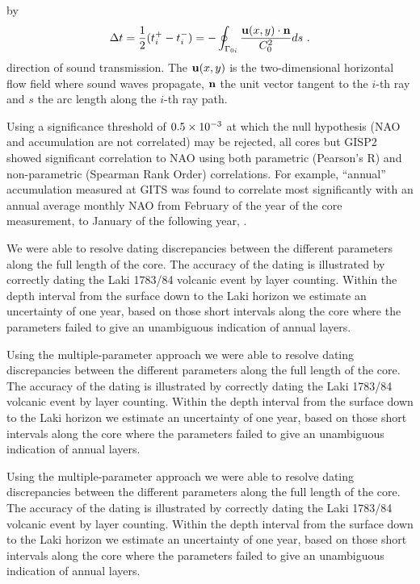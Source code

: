 \documentclass[jgrga]{agu2001}
\let\eject\relax
\begin{document}
\begin{article}
\eject
\noindent
 by
\begin{equation}
  \Delta t = \frac{1}{2} ( t_i^+ - t_i^- ) = - \oint_{\Gamma_{0i}}
  \frac{{\bf u}(x,y)\cdot {\bf n}}{C_0^2} ds\ .
\end{equation}
 direction of sound
transmission. 
The ${\bf u}(x,y)$ is the two-dimensional
horizontal
flow field where sound waves propagate, ${\bf n}$ the unit vector
tangent to the $i$-th ray and $s$ the arc length along the $i$-th
ray path. 

Using a significance threshold
of $\rm{0.5 \times 10^{-3}}$
at which the null hypothesis
(NAO and accumulation are not correlated) may be rejected,
all cores but GISP2 showed significant 
correlation to NAO using both parametric (Pearson's R) and non-parametric
(Spearman Rank Order) correlations.
For example, ``annual'' accumulation measured at GITS was found to correlate
most significantly with an annual average monthly NAO from February of the year
of the core measurement, to January of the following year,
 .



We were able to resolve dating discrepancies between the different
parameters along the full length of the core.
The accuracy of the dating is illustrated by correctly dating the
Laki 1783/84 volcanic event by layer counting.
Within the depth interval from the surface down to the Laki horizon
we estimate an
uncertainty of one year, based on those short intervals along the
core where the parameters failed to give an unambiguous indication
of annual layers.

Using the multiple-parameter approach we
were able to resolve dating discrepancies between the different
parameters along the full length of the core.
The accuracy of the dating is illustrated by correctly dating the
Laki 1783/84 volcanic event by layer counting.
Within the depth interval from the surface down to the Laki horizon
we estimate an
uncertainty of one year, based on those short intervals along the
core where the parameters failed to give an unambiguous indication
of annual layers. 

Using the multiple-parameter approach we
were able to resolve dating discrepancies between the different
parameters along the full length of the core.
The accuracy of the dating is illustrated by correctly dating the
Laki 1783/84 volcanic event by layer counting.
Within the depth interval from the surface down to the Laki horizon
we estimate an
uncertainty of one year, based on those short intervals along the
core where the parameters failed to give an unambiguous indication
of annual layers.  








\end{article}
\end{document}
